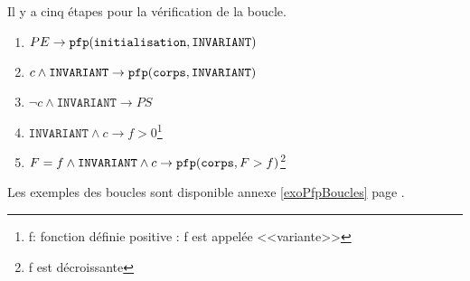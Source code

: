 Il y a cinq étapes pour la vérification de la boucle.
\begin{enumerate}
	\item $PE \rightarrow \pfp(\texttt{initialisation}, \texttt{INVARIANT})$
	\item $c \wedge \texttt{INVARIANT} \rightarrow \pfp (\texttt{corps}, \texttt{INVARIANT})$\label{etape2boucle}
	\item $\neg c \wedge \texttt{INVARIANT} \rightarrow PS$ \label{etape3boucle}
	\item $ \texttt{INVARIANT} \wedge c \rightarrow f > 0$\footnote{f: fonction définie positive : f est appelée <<variante>>}
	\item $F = f \wedge \texttt{INVARIANT} \wedge c \rightarrow \pfp (\texttt{corps}, F > f)$\footnote{f est décroissante}
\end{enumerate}

Les exemples des boucles sont disponible annexe \ref{exoPfpBoucles} page \pageref{exoPfpBoucles}. 
